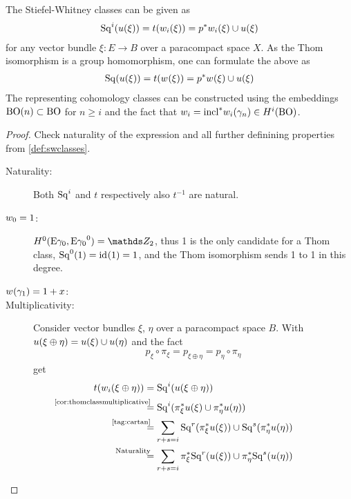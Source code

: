 \begin{Thm}\label{thm:altdefswclasses}
  The Stiefel-Whitney classes can be given as
  \begin{gather*}
    \mathrm{Sq}^{i}({u}(\xi)) = t({w_{i}}(\xi)) = {p}^* {w_{i}}(\xi) \cup {u}(\xi)
  \end{gather*}
  for any vector bundle $\xi\colon E\to B$ over a paracompact space
  $X$. As the Thom isomorphism is a group homomorphism, one can
  formulate the above as
  \begin{gather*}
    \mathrm{Sq}({u}(\xi)) = t({w_{}}(\xi)) = {p}^* {w_{}}(\xi) \cup {u}(\xi)
  \end{gather*}
  The representing cohomology classes can be constructed using the
  embeddings $\mathrm{BO}(n)\subset\mathrm{BO}$ for $n\geq i$ and the fact that
  $w_{i}={\mathrm{incl}}^*{w_{i}}(\gamma_n)\in H^i(\mathrm{BO})$. %
  \begin{proof}
    Check naturality of the expression and all further
    definining properties from \autoref{def:swclasses}.
    \begin{description}
    \item[Naturality:] Both $\mathrm{Sq}^{i}$ and $t$ respectively also $t^{-1}$
      are natural.
    \item[$w_{0}=1$:]
      $\H^0(\thomspacepair{\E{\gamma_0}}) = \Zmod2$, thus 1 is the only
      candidate for a Thom class, $\mathrm{Sq}^{0}(1) = \mathrm{id}_{}(1) = 1$, and the Thom
      isomorphism sends 1 to 1 in this degree.
    \item[${w_{}}(\gamma_1)=1+x$:] %
    \item[Multiplicativity:] %
      Consider vector bundles $\xi$, $\eta$ over a paracompact space
      $B$. With ${u}(\xi\oplus\eta)={u}(\xi)\cup{u}(\eta)$ and the fact
      \begin{gather}\label{eq:projectionscommute}
        p_\xi\circ\pi_\xi = p_{\xi\oplus\eta} = p_\eta\circ\pi_\eta
      \end{gather}
      get
      \begin{align*}
        \thomiso(\w{i}{\xi\oplus\eta})
        &= \Sq i(\u{\xi\oplus\eta}) \\
        &\equalsby{\autoref{cor:thomclassmultiplicative}}
          \Sq i(\pb\pi_\xi\u{\xi} \cup \pb\pi_\eta\u{\eta})\\
        &\equalsby{\ref{tag:cartan}}
          \sum_{r+s=i}
          \Sq r(\pb\pi_\xi\u{\xi}) \cup \Sq s(\pb \pi_\eta\u{\eta}) \\
        &\equalsby{Naturality}
          \sum_{r+s=i}
          \pb\pi_\xi\Sq r(\u{\xi}) \cup \pb \pi_\eta\Sq s(\u{\eta}) \\

\end{align*}
\end{description}
\end{proof}
\end{Thm}
